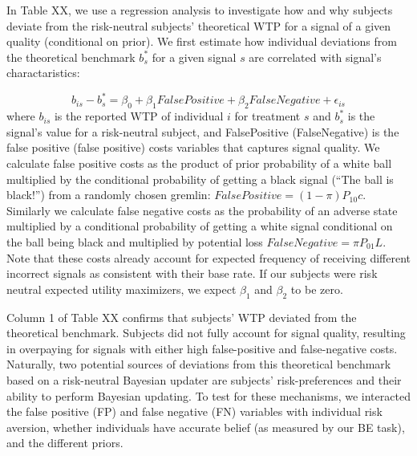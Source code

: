 \documentclass[12pt,a4paper]{article}
\begin{document}




In Table XX, we use a regression analysis to investigate how and why subjects deviate from the risk-neutral subjects’ theoretical WTP for a signal of a given quality (conditional on prior). We first estimate how individual deviations from the theoretical benchmark $b^*_s$ for a given signal $s$ are correlated with signal's charactaristics:

\[b_{is} - b^*_s = \beta_0 + \beta_1 FalsePositive + \beta_2 FalseNegative + \epsilon_{is}\]
where $b_{is}$ is the reported WTP of individual $i$ for treatment $s$ and $b^*_s$ is the signal's value for a risk-neutral subject, and FalsePositive (FalseNegative) is the false positive (false positive) costs variables that captures signal quality. We calculate false positive costs as the product of prior probability of a white ball multiplied by the conditional probability of getting a black signal (“The ball is black!”) from a randomly chosen gremlin: $FalsePositive=(1-\pi) P_{10}c$. Similarly we calculate false negative costs as the probability of an adverse state multiplied by a conditional probability of getting a white signal conditional on the ball being black and multiplied by potential loss $FalseNegative=\pi P_{01}L$. Note that these costs already account for expected frequency of receiving different incorrect signals as consistent with their base rate. If our subjects were risk neutral expected utility maximizers, we expect $\beta_1$ and $\beta_2$ to be zero.






Column 1 of Table XX confirms that subjects’ WTP deviated from the theoretical benchmark. Subjects did not fully account for signal quality, resulting in overpaying for signals with either high false-positive and false-negative costs. Naturally, two potential sources of deviations from this theoretical benchmark based on a risk-neutral Bayesian updater are subjects’ risk-preferences and their ability to perform Bayesian updating. To test for these mechanisms, we interacted the false positive (FP) and false negative (FN) variables with individual risk aversion, whether individuals have accurate belief (as measured by our BE task), and the different priors.
\end{document}

